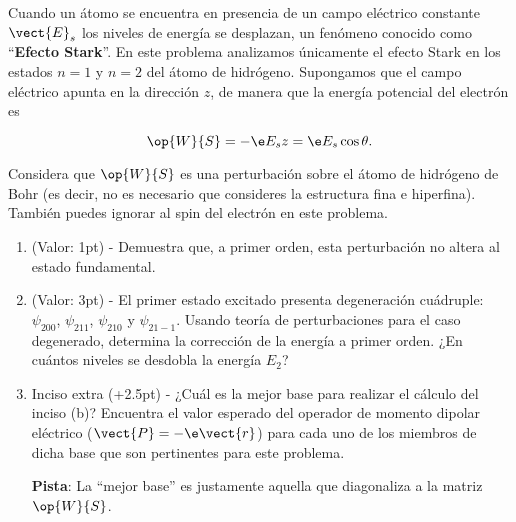 \documentclass[./../main.tex]{subfiles}
\begin{document}
    \begin{exercise}
        Cuando un átomo se encuentra en presencia de un campo eléctrico constante \(\vect{E}_{s}\) los niveles de energía se desplazan, un fenómeno conocido como ``\textbf{Efecto Stark}''. En este problema analizamos únicamente el efecto Stark en los estados \(n = 1\) y \(n = 2\) del átomo de hidrógeno. Supongamos que el campo eléctrico apunta en la dirección \(z\), de manera que la energía potencial del electrón es

        \begin{equation*}
            \op{W}{S} = -\e E_{s}z = \e E_{s}\cos\theta.
        \end{equation*}

        Considera que \(\op{W}{S}\) es una perturbación sobre el átomo de hidrógeno de Bohr (es decir, no es necesario que consideres la estructura fina e hiperfina). También puedes ignorar al spin del electrón en este problema.

        \begin{enumerate}
            \item (Valor: 1pt) - Demuestra que, a primer orden, esta perturbación no altera al estado fundamental.
            \item (Valor: 3pt) - El primer estado excitado presenta degeneración cuádruple: \(\psi_{200}\), \(\psi_{211}\), \(\psi_{210}\) y \(\psi_{21-1}\). Usando teoría de perturbaciones para el caso degenerado, determina la corrección de la energía a primer orden. ¿En cuántos niveles se desdobla la energía \(E_{2}\)?
            
            \color{blue}
            \item Inciso extra (+2.5pt) - ¿Cuál es la mejor base para realizar el cálculo del inciso (b)? Encuentra el valor esperado del operador de momento dipolar eléctrico (\(\vect{P} = -\e\vect{r}\)) para cada uno de los miembros de dicha base que son pertinentes para este problema.
            
            \textbf{Pista}: La ``mejor base'' es justamente aquella que diagonaliza a la matriz \(\op{W}{S}\).
        \end{enumerate}
    \end{exercise}
\end{document}

